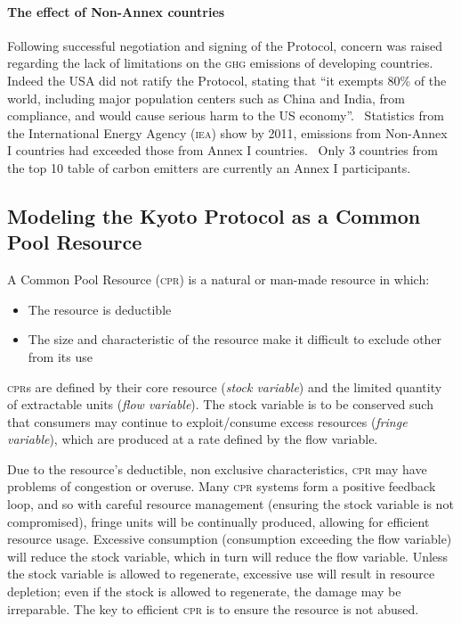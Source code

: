 \paragraph{The effect of Non-Annex countries}

Following successful negotiation and signing of the Protocol, concern was raised regarding the lack of limitations on the \textsc{ghg} emissions of developing countries. Indeed the \textsc{USA} did not ratify the Protocol, stating that ``it exempts 80\% of the world, including major population centers such as China and India, from compliance, and would cause serious harm to the US economy''.~\cite{Hague-to-Marrakesh} Statistics from the International Energy Agency (\textsc{iea}) show by 2011, emissions from Non-Annex I countries had exceeded those from Annex I countries.~\cite{IEA-highlights} Only 3 countries from the top 10 table of carbon emitters are currently an Annex I participants.

\subsection{Modeling the Kyoto Protocol as a Common Pool Resource}

A Common Pool Resource (\textsc{cpr}) is a natural or man-made resource in which:~\cite{Ostrom-90}

\begin{itemize}
	\item The resource is deductible
	\item The size and characteristic of the resource make it difficult to exclude other from its use
\end{itemize}

\textsc{cpr}s are defined by their core resource (\emph{stock variable}) and the limited quantity of extractable units (\emph{flow variable}). The stock variable is to be conserved such that consumers may continue to exploit/consume excess resources (\emph{fringe variable}), which are produced at a rate defined by the flow variable.

Due to the resource's deductible, non exclusive characteristics, \textsc{cpr} may have problems of congestion or overuse. Many \textsc{cpr} systems form a positive feedback loop, and so with careful resource management (ensuring the stock variable is not compromised), fringe units will be continually produced, allowing for efficient resource usage. Excessive consumption (consumption exceeding the flow variable) will reduce the stock variable, which in turn will reduce the flow variable. Unless the stock variable is allowed to regenerate, excessive use will result in resource depletion; even if the stock is allowed to regenerate, the damage may be irreparable. The key to efficient \textsc{cpr} is to ensure the resource is not abused.

